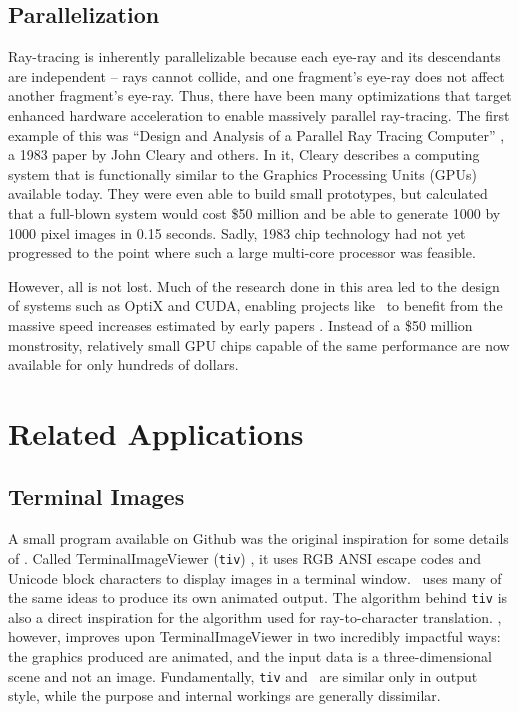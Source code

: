 \subsection{Parallelization}

Ray-tracing is inherently parallelizable because each eye-ray and its descendants are independent -- rays cannot collide, and one fragment's eye-ray does not affect another fragment's eye-ray.
Thus, there have been many optimizations that target enhanced hardware acceleration to enable massively parallel ray-tracing.
The first example of this was ``Design and Analysis of a Parallel Ray Tracing Computer'' \cite{cleary1983design}, a 1983 paper by John Cleary and others.
In it, Cleary describes a computing system that is functionally similar to the Graphics Processing Units (GPUs) available today.
They were even able to build small prototypes, but calculated that a full-blown system would cost \$50 million and be able to generate 1000 by 1000 pixel images in 0.15 seconds.
Sadly, 1983 chip technology had not yet progressed to the point where such a large multi-core processor was feasible.

However, all is not lost.
Much of the research done in this area led to the design of systems such as OptiX and CUDA, enabling projects like \name\ to benefit from the massive speed increases estimated by early papers \cite{parker2010optix, nvidia2011cuda, whitted2018explains}.
Instead of a \$50 million monstrosity, relatively small GPU chips capable of the same performance are now available for only hundreds of dollars.

\section{Related Applications}

\subsection{Terminal Images}

A small program available on Github was the original inspiration for some details of \name.
Called TerminalImageViewer (\texttt{tiv}) \cite{tivGithub}, it uses RGB ANSI escape codes and Unicode block characters to display images in a terminal window.
\name\ uses many of the same ideas to produce its own animated output.
The algorithm behind \texttt{tiv} is also a direct inspiration for the algorithm used for ray-to-character translation.
\name, however, improves upon TerminalImageViewer in two incredibly impactful ways: the graphics produced are animated, and the input data is a three-dimensional scene and not an image.
Fundamentally, \texttt{tiv} and \name\ are similar only in output style, while the purpose and internal workings are generally dissimilar.

